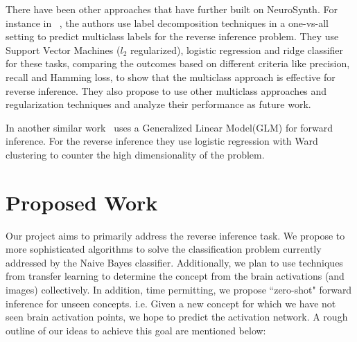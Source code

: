 \documentclass[11pt]{article}
\begin{document}
There have been other approaches that have further built on NeuroSynth. For instance in ~\cite{sanmi2013multi}, the authors use label decomposition techniques in a one-vs-all setting to predict multiclass labels for the reverse inference problem. They use Support Vector Machines ($l_2$ regularized), logistic regression and ridge classifier for these tasks,  comparing the outcomes based on different criteria like precision, recall and Hamming loss, to show that the multiclass approach is effective for reverse inference. They also propose to use other multiclass approaches and regularization techniques and analyze their performance as future work. 

In another similar work~\cite{schwartz2013mapping} uses a Generalized Linear Model(GLM) for forward inference. For the reverse inference they use logistic regression with Ward clustering to counter the high dimensionality of the problem. 





\section{Proposed Work}

Our project aims to primarily address the reverse inference task. We propose to more sophisticated algorithms to solve the classification problem currently addressed by the Naive Bayes classifier. Additionally, we plan to use techniques from transfer learning to determine the concept from the brain activations (and images) collectively. In addition, time permitting, we propose ``zero-shot" forward inference for unseen concepts. i.e. Given a new concept for which we have not seen brain activation points, we hope to predict the activation network. A rough outline of our ideas to achieve this goal are mentioned below:
\end{document}
